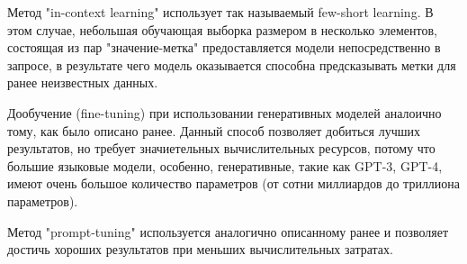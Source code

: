 Метод "in-context learning" использует так называемый few-short learning. В этом случае, небольшая обучающая выборка размером в несколько элементов, состоящая из пар "значение-метка" предоставляется модели непосредственно в запросе, в результате чего модель оказывается способна предсказывать метки для ранее неизвестных данных.

Дообучение (fine-tuning) при использовании генеративных моделей аналоично тому, как было описано ранее. Данный способ позволяет добиться лучших результатов, но требует значиетельных вычислительных ресурсов, потому что большие языковые модели, особенно, генеративные, такие как GPT-3, GPT-4, имеют очень большое количество параметров (от сотни миллиардов до триллиона параметров).

Метод "prompt-tuning" используется аналогично описанному ранее и позволяет достичь хороших результатов при меньших вычислительных затратах.

